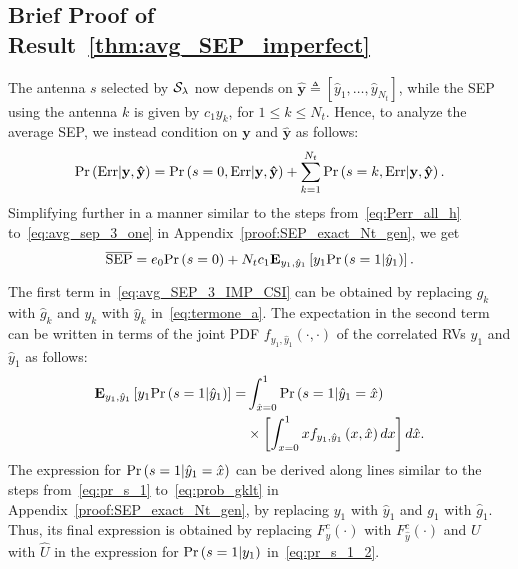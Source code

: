 \documentclass[journal]{IEEEtran}
\newcommand{\brac}[1]{\left({#1}\right)}
\newcommand{\define}{\triangleq}
\newcommand{\explow}[2]{{\bf{E}}_{#1}\left[{#2}\right]}
\newcommand{\prob}[1]{\text{Pr}\brac{#1}}
\newcommand{\given}{\arrowvert}
\newcommand{\SEP}{\text{SEP}}
\newcommand{\y}{\mathbf{y}}
\newcommand{\nx}{{0}}
\newcommand{\lam}{\lambda}
\newcommand{\Err}{{\text{Err}}}
\newcommand{\Nt}{{N_t}}
\newcommand{\puch}{g}
\newcommand{\gk}[1]{{\puch_{#1}}}
\newcommand{\yhatvec}{\mathbf{\hat{y}}}
\newcommand{\cone}{c_{1}}
\newcommand{\yk}[1]{y_{#1}}
\newcommand{\un}{U}
\newcommand{\zerosep}{e_0}
\newcommand{\callamrule}{{\cal S_{{\lam}}}}
\newcommand{\avgSEP}{\overline{\SEP}}
\newcommand{\unhat}{\widehat{\un}}
\newcommand{\ghat}{\hat{\puch}}
\newcommand{\yhat}{\hat{y}}
\newcommand{\gkhat}[1]{\ghat_{#1}}
\newcommand{\ykhat}[1]{\hat{y}_{#1}}
\newcommand{\ccdfyrv}[1]{ F^{c}_{y}\left(#1 \right) }
\newcommand{\ccdfyhatrv}[1]{F^{c}_{\yhat}\left(#1 \right) }
\newcommand{\xhat}{\hat{x}}
\begin{document}
\subsection{Brief Proof of Result~\ref{thm:avg_SEP_imperfect}}
\label{proof:avg_SEP_imperfect_CSI}
The antenna $s$ selected by $\callamrule$  now depends on $\yhatvec\define\left[\ykhat{1},\ldots,\ykhat{\Nt} \right]$, while the SEP using the antenna $k$ is given by $\cone\yk{k}$, for $1\leq k\leq\Nt$.  Hence, to analyze the average SEP, we instead condition on $\y$ and  $\yhatvec$ as follows:
%
\begin{equation}
\prob{\Err \given \y,\yhatvec} =  \prob{s=\nx,\Err\given \y, \yhatvec} + \sum_{k=1}^{\Nt}\prob{s=k,\Err\given\y,\yhatvec}.
\label{eq:Perr_all_imp_csi}
\end{equation} 
%
Simplifying further in a manner similar to the steps from~\eqref{eq:Perr_all_h} to~\eqref{eq:avg_sep_3_one} in Appendix~\ref{proof:SEP_exact_Nt_gen}, we get
%
\begin{equation}
\label{eq:avg_SEP_3_IMP_CSI}
\avgSEP = \zerosep \prob{s=\nx} + \Nt\cone\explow{\yk{1},\ykhat{1}}{\yk{1}\prob{s=1\given \ykhat{1}}}.
\end{equation}
%

The first term in~\eqref{eq:avg_SEP_3_IMP_CSI} can be obtained by replacing $\gk{k}$ with $\gkhat{k}$ and $\yk{k}$ with $\ykhat{k}$ in~\eqref{eq:termone_a}. The expectation in the second term can be written in terms of the joint PDF $f_{\yk{1},\ykhat{1}}\left(\cdot,\cdot\right)$ of the correlated RVs $\yk{1}$ and $\ykhat{1}$ as follows:
%
\begin{align}
\label{eq:avg_SEP_4_IMP_CSI}
\explow{\yk{1},\ykhat{1}}{\yk{1}\prob{s=1\given \ykhat{1}}}= &\int_{\xhat=0}^{1} \prob{s=1\given \ykhat{1}=\xhat} \nonumber\\
&\times\left[ \int_{x=0}^{1}  x  f_{\yk{1},\ykhat{1}}\left(x,\xhat\right)dx\right] d\xhat.
\end{align}
%
The expression for $\prob{s=1\given\ykhat{1}=\xhat}$ can be derived along lines similar to the steps from~\eqref{eq:pr_s_1} to~\eqref{eq:prob_gklt} in Appendix~\ref{proof:SEP_exact_Nt_gen}, by replacing $\yk{1}$ with $\ykhat{1}$ and $\gk{1}$ with $\gkhat{1}$. Thus, its final expression is obtained by replacing $\ccdfyrv{\cdot}$ with $\ccdfyhatrv{\cdot}$ and $\un$  with $\unhat$ in the expression for  $\prob{s=1\given\yk{1}}$ in~\eqref{eq:pr_s_1_2}. 
\end{document}
